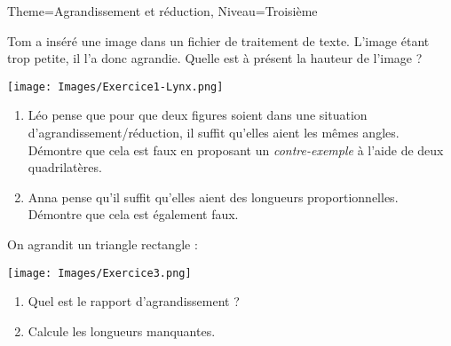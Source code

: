 \documentclass[11pt]{article}
\begin{document}
\begin{Maquette}[Fiche]{Theme=Agrandissement et réduction, Niveau=Troisième}

\begin{exercice}
   Tom a inséré une image dans un fichier de traitement de texte. L’image étant trop petite, il l’a donc agrandie. Quelle est à présent la hauteur de l’image ?
   \begin{center}
    \texttt{[image: Images/Exercice1-Lynx.png]}
   \end{center}
\end{exercice}

\begin{multicols}{2}

   \begin{exercice}
      \begin{enumerate}
         \item Léo pense que pour que deux figures soient dans une situation d’agrandissement/réduction, il suffit qu’elles aient les mêmes angles. Démontre que cela est faux en proposant un \emph{contre-exemple} à l’aide de deux quadrilatères.
         \item Anna pense qu’il suffit qu’elles aient des longueurs proportionnelles. Démontre que cela est également faux.
      \end{enumerate}
      
   \end{exercice}

   \begin{exercice}
      On agrandit un triangle rectangle :
      \begin{center}
         \texttt{[image: Images/Exercice3.png]}
      \end{center}
      \begin{enumerate}
         \item Quel est le rapport d’agrandissement ?
         \item Calcule les longueurs manquantes.
      \end{enumerate}
   \end{exercice}
\end{multicols}

\end{Maquette}
\end{document}
